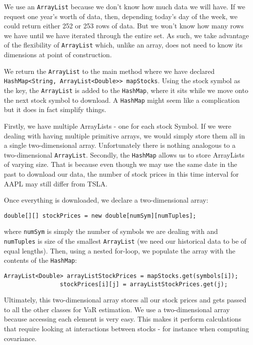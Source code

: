 \documentclass[../Dissertation.tex]{subfiles}
\begin{document}
We use an \lstinline|ArrayList| because we don't know how much data we will have.
If we request one year's worth of data, then, depending today's day of the week, we could return either 252 or 253 rows of data.
But we won't know how many rows we have until we have iterated through the entire set.
As such, we take advantage of the flexibility of \lstinline|ArrayList| which, unlike an array, does not need to know its dimensions at point of construction.

We return the \lstinline|ArrayList| to the main method where we have declared \lstinline|HashMap<String, ArrayList<Double>> mapStocks|.
Using the stock symbol as the key, the \lstinline|ArrayList| is added to the \lstinline|HashMap|, where it sits while we move onto the next stock symbol to download.
A \lstinline|HashMap| might seem like a complication but it does in fact simplify things.

Firstly, we have multiple ArrayLists - one for each stock Symbol.
If we were dealing with having multiple primitive arrays, we would simply store them all in a single two-dimensional array.
Unfortunately there is nothing analogous to a two-dimensional \lstinline|ArrayList|.
Secondly, the \lstinline|HashMap| allows us to store ArrayLists of varying size.
That is because even though we may use the same date in the past to download our data, the number of stock prices in this time interval for AAPL may still differ from TSLA.

Once everything is downloaded, we declare a two-dimensional array:
\begin{lstlisting}[firstnumber = 78]
double[][] stockPrices = new double[numSym][numTuples];
\end{lstlisting}
where \lstinline|numSym| is simply the number of symbols we are dealing with and \lstinline|numTuples| is size of the smallest \lstinline|ArrayList| (we need our historical data to be of equal lengths).
Then, using a nested for-loop, we populate the array with the contents of the \lstinline|HashMap|:
\begin{lstlisting}[firstnumber = 82]
ArrayList<Double> arrayListStockPrices = mapStocks.get(symbols[i]);
                stockPrices[i][j] = arrayListStockPrices.get(j);
\end{lstlisting}                

Ultimately, this two-dimensional array stores all our stock prices and gets passed to all the other classes for VaR estimation.
We use a two-dimensional array because accessing each element is very easy.
This makes it perform calculations that require looking at interactions between stocks - for instance when computing covariance.
\end{document}
